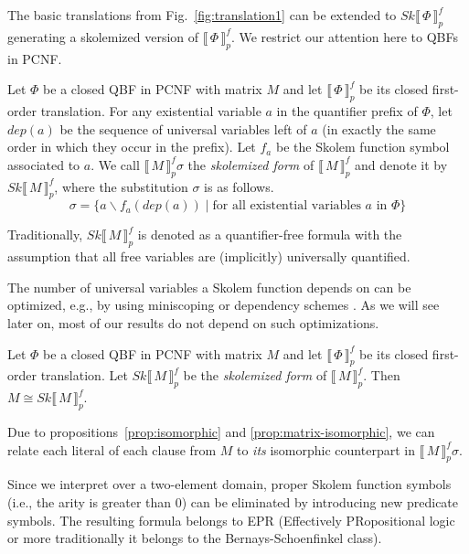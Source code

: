 \documentclass{llncs}
\newcommand{\dep}[1]{\mathit{dep}(#1)}
\newcommand{\QBFtoPL}[3]{\llbracket\,#1\,\rrbracket_{#2}^{#3}}
\newcommand{\SkQBFtoPL}[3]{\mathit{Sk}\llbracket\,#1\,\rrbracket_{#2}^{#3}}
\begin{document}
The basic translations from Fig.~\ref{fig:translation1} can be
extended to $\SkQBFtoPL{\Phi}{p}{f}$ generating a skolemized version
of $\QBFtoPL{\Phi}{p}{f}$. We restrict our attention here to QBFs in
PCNF.

\begin{definition}
Let $\Phi$ be a closed QBF in PCNF with matrix $M$ and let
$\QBFtoPL{\Phi}{p}{f}$ be its closed first-order translation.  For any
existential variable $a$ in the quantifier prefix of $\Phi$, let
$\dep{a}$ be the sequence of universal variables left of $a$ (in
exactly the same order in which they occur in the prefix). Let $f_a$
be the Skolem function symbol associated to $a$.  We call
$\QBFtoPL{M}{p}{f} \sigma$ the \emph{skolemized form} of
$\QBFtoPL{M}{p}{f}$ and denote it by $\SkQBFtoPL{M}{p}{f}$, where the
substitution $\sigma$ is as follows.
$$
\sigma = \{ a \backslash f_a(\dep{a}) \mid \text{for all existential variables
  $a$ in $\Phi$}\}
$$
\end{definition}
Traditionally, $\SkQBFtoPL{M}{p}{f}$ is denoted as a quantifier-free
formula with the assumption that all free variables are (implicitly)
universally quantified. 

The number of universal variables a Skolem function depends on can be
optimized, e.g., by using miniscoping or dependency schemes
\cite{DBLP:conf/cade/SeidlLB12}. As we will see later on, most of our
results do not depend on such optimizations.

\begin{proposition}\label{prop:matrix-isomorphic}
Let $\Phi$ be a closed QBF in PCNF with matrix $M$ and let
$\QBFtoPL{\Phi}{p}{f}$ be its closed first-order translation.  Let
$\SkQBFtoPL{M}{p}{f}$ be the \emph{skolemized form} of
$\QBFtoPL{M}{p}{f}$. Then $M \cong \SkQBFtoPL{M}{p}{f}$. 
\end{proposition}

Due to propositions~\ref{prop:isomorphic} and
\ref{prop:matrix-isomorphic},
we can relate each literal of each clause from $M$ to \emph{its}
isomorphic counterpart in $\QBFtoPL{M}{p}{f} \sigma$.

Since we interpret over a two-element domain, proper Skolem function
symbols (i.e., the arity is greater than $0$) can be eliminated by
introducing new predicate symbols. The resulting formula belongs to
EPR (Effectively PRopositional logic or more traditionally it belongs
to the Bernays-Schoenfinkel class).
\end{document}
